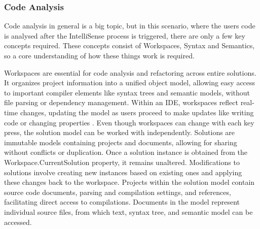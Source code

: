\subsubsection{Code Analysis}
\label{sssec:RoslynCodeAnalysis}
Code analysis in general is a big topic, but in this scenario, where the users code is analysed after the IntelliSense process is triggered, there are only a few key concepts required. These concepts consist of Workspaces, Syntax and Semantics, so a core understanding of how these things work is required.

Workspaces are essential for code analysis and refactoring across entire solutions. It organizes project information into a unified object model, allowing easy access to important compiler elements like syntax trees and semantic models, without file parsing or dependency management. Within an IDE, workspaces reflect real-time changes, updating the model as users proceed to make updates like writing code or changing properties \citep{roslynWorkspace}. Even though workspaces can change with each key press, the solution model can be worked with independently. Solutions are immutable models containing projects and documents, allowing for sharing without conflicts or duplication. Once a solution instance is obtained from the Workspace.CurrentSolution property, it remains unaltered. Modifications to solutions involve creating new instances based on existing ones and applying these changes back to the workspace. Projects within the solution model contain source code documents, parsing and compilation settings, and references, facilitating direct access to compilations. Documents in the model represent individual source files, from which text, syntax tree, and semantic model can be accessed. \citep{roslynWorkspace}

